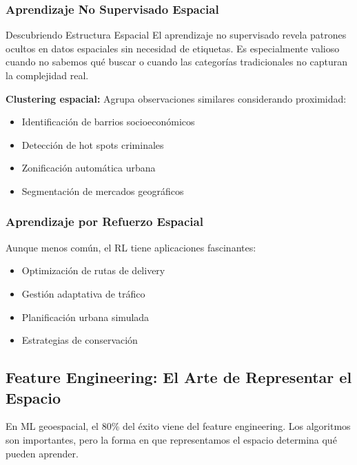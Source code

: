 \documentclass[12pt,a4paper]{article}
\begin{document}
\subsubsection{Aprendizaje No Supervisado Espacial}

\begin{conceptbox}{Descubriendo Estructura Espacial}
El aprendizaje no supervisado revela patrones ocultos en datos espaciales sin necesidad de etiquetas. Es especialmente valioso cuando no sabemos qué buscar o cuando las categorías tradicionales no capturan la complejidad real.
\end{conceptbox}

\textbf{Clustering espacial:} Agrupa observaciones similares considerando proximidad:
\begin{itemize}
    \item Identificación de barrios socioeconómicos
    \item Detección de hot spots criminales
    \item Zonificación automática urbana
    \item Segmentación de mercados geográficos
\end{itemize}

\subsubsection{Aprendizaje por Refuerzo Espacial}

Aunque menos común, el RL tiene aplicaciones fascinantes:
\begin{itemize}
    \item Optimización de rutas de delivery
    \item Gestión adaptativa de tráfico
    \item Planificación urbana simulada
    \item Estrategias de conservación
\end{itemize}

\subsection{Feature Engineering: El Arte de Representar el Espacio}

\begin{alertbox}
En ML geoespacial, el 80\% del éxito viene del feature engineering. Los algoritmos son importantes, pero la forma en que representamos el espacio determina qué pueden aprender.
\end{alertbox}
\end{document}

